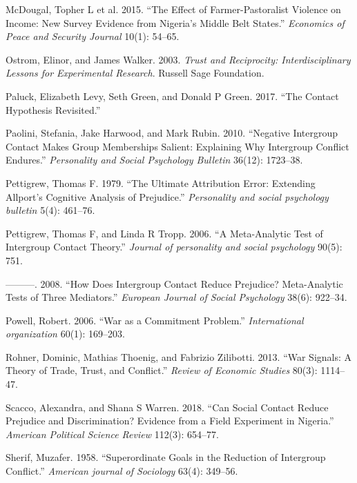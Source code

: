 \documentclass[11pt]{article}
\begin{document}
\hypertarget{ref-mcdougal2015effect}{}
McDougal, Topher L et al. 2015. ``The Effect of Farmer-Pastoralist
Violence on Income: New Survey Evidence from Nigeria's Middle Belt
States.'' \emph{Economics of Peace and Security Journal} 10(1): 54--65.

\hypertarget{ref-ostrom2003trust}{}
Ostrom, Elinor, and James Walker. 2003. \emph{Trust and Reciprocity:
Interdisciplinary Lessons for Experimental Research}. Russell Sage
Foundation.

\hypertarget{ref-paluck2017contact}{}
Paluck, Elizabeth Levy, Seth Green, and Donald P Green. 2017. ``The
Contact Hypothesis Revisited.''

\hypertarget{ref-paolini2010negative}{}
Paolini, Stefania, Jake Harwood, and Mark Rubin. 2010. ``Negative
Intergroup Contact Makes Group Memberships Salient: Explaining Why
Intergroup Conflict Endures.'' \emph{Personality and Social Psychology
Bulletin} 36(12): 1723--38.

\hypertarget{ref-pettigrew1979ultimate}{}
Pettigrew, Thomas F. 1979. ``The Ultimate Attribution Error: Extending
Allport's Cognitive Analysis of Prejudice.'' \emph{Personality and
social psychology bulletin} 5(4): 461--76.

\hypertarget{ref-pettigrew2006meta}{}
Pettigrew, Thomas F, and Linda R Tropp. 2006. ``A Meta-Analytic Test of
Intergroup Contact Theory.'' \emph{Journal of personality and social
psychology} 90(5): 751.

\hypertarget{ref-pettigrew2008does}{}
---------. 2008. ``How Does Intergroup Contact Reduce Prejudice?
Meta-Analytic Tests of Three Mediators.'' \emph{European Journal of
Social Psychology} 38(6): 922--34.

\hypertarget{ref-powell2006war}{}
Powell, Robert. 2006. ``War as a Commitment Problem.''
\emph{International organization} 60(1): 169--203.

\hypertarget{ref-rohner2013war}{}
Rohner, Dominic, Mathias Thoenig, and Fabrizio Zilibotti. 2013. ``War
Signals: A Theory of Trade, Trust, and Conflict.'' \emph{Review of
Economic Studies} 80(3): 1114--47.

\hypertarget{ref-scacco2018nigeria}{}
Scacco, Alexandra, and Shana S Warren. 2018. ``Can Social Contact Reduce
Prejudice and Discrimination? Evidence from a Field Experiment in
Nigeria.'' \emph{American Political Science Review} 112(3): 654--77.

\hypertarget{ref-sherif1958superordinate}{}
Sherif, Muzafer. 1958. ``Superordinate Goals in the Reduction of
Intergroup Conflict.'' \emph{American journal of Sociology} 63(4):
349--56.
\end{document}
